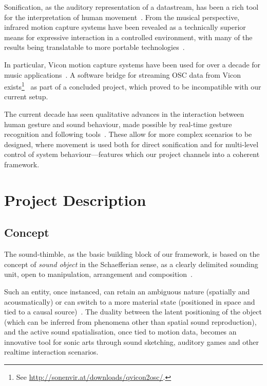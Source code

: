 \documentclass{nime-alternate}
\begin{document}
Sonification, as the auditory representation of a datastream, has been a rich tool for the interpretation of human movement~\cite{hermann2011sonification}. From the musical perspective, infrared motion capture systems have been revealed as a technically superior means for expressive interaction in a controlled environment, with many of the results being translatable to more portable technologies~\cite{skogstad2010using,vigliensoni2012quantitative}.

In particular, Vicon motion capture systems have been used for over a decade for music applications~\cite{dobrian2003gestural,kapur2005framework,eckel2009motion,vigliensoni2012quantitative}. A software bridge for streaming OSC data from Vicon \linebreak exists\footnote{See \url{http://sonenvir.at/downloads/qvicon2osc/}.}~\cite{eckel2009motion} as part of a concluded project, which proved to be incompatible with our current setup.

The current decade has seen qualitative advances in the interaction between human gesture and sound behaviour, made possible by real-time gesture recognition and following tools~\cite{probabilisticmodels}. These allow for more complex scenarios to be designed, where movement is used both for direct sonification and for multi-level control of system behaviour---features which our project channels into a coherent framework.


\section{Project Description}
\label{sec:proj}

\subsection{Concept}


The sound-thimble, as the basic building block of our framework, is based on the concept of \textit{sound object} in the Schaefferian sense, as a clearly delimited sounding unit, open to manipulation, arrangement and composition~\cite{schaeffer1998solfege}.

Such an entity, once instanced, can retain an ambiguous nature (spatially and acousmatically) or can switch to a more material state (positioned in space and tied to a causal source)~\cite{soundunseen}. The duality between the latent positioning of the object (which can be inferred from phenomena other than spatial sound reproduction), and the active sound spatialisation, once tied to motion data, becomes an innovative tool for sonic arts through sound sketching, auditory games and other realtime interaction scenarios.
\end{document}
